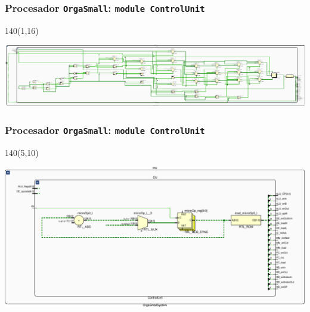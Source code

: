 \documentclass[aspectratio=169]{beamer}
\begin{document}
\begin{frame}[fragile,t]
    \frametitle{Procesador \texttt{OrgaSmall}: \texttt{module ControlUnit}}
    \begin{textblock}{140}(1,16)
    \begin{center}
    \includegraphics[scale=0.81]{pdf/schematicCU-crop.pdf}
    \end{center}
    \end{textblock}
\end{frame}

\begin{frame}[fragile,t]
    \frametitle{Procesador \texttt{OrgaSmall}: \texttt{module ControlUnit}}
    \begin{textblock}{140}(5,10)
    \begin{center}
    \includegraphics[scale=0.8]{pdf/schematicCU2-crop.pdf}
    \end{center}
    \end{textblock}
\end{frame}
\end{document}
